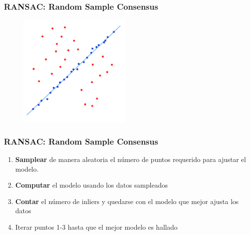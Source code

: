 \begin{frame}
	\frametitle{RANSAC: Random Sample Consensus}
	\footnotesize
	
	
	\begin{figure}
		\includegraphics[width=0.5\textwidth]{./images/ransac_fitted_line.pdf}
	\end{figure}
	
\end{frame}
\begin{frame}
	\frametitle{RANSAC: Random Sample Consensus}
	\footnotesize

	\begin{enumerate}
		\item {\bf Samplear} de manera aleatoria el número de puntos requerido para ajustar el modelo.
		\item {\bf Computar} el modelo usando los datos sampleados
		\item {\bf Contar} el número de inliers y quedarse con el modelo que mejor ajusta los datos
		\item Iterar puntos 1-3 hasta que el mejor modelo es hallado
	\end{enumerate}

\end{frame}

